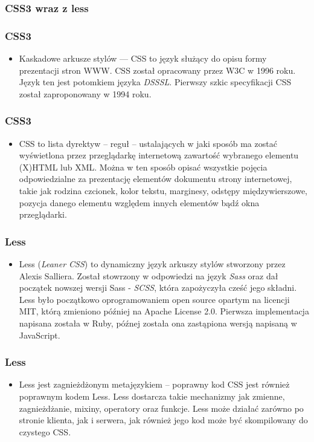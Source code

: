 \documentclass{beamer}
\newenvironment{justbe}%
{\setlength{\leftmargini}{0pt}\begin{itemize}\item[]}%
{\end{itemize}}
\begin{document}
\subsubsection{CSS3 wraz z less}
\begin{frame}
 \frametitle{CSS3}
 \begin{justbe}
  Kaskadowe arkusze stylów --- CSS to język służący do opisu formy prezentacji stron WWW. CSS został opracowany przez W3C w 1996 roku. Język ten jest potomkiem języka \emph{DSSSL}. Pierwszy szkic specyfikacji CSS został zaproponowany w 1994 roku. 
 \end{justbe}
\end{frame}

\begin{frame}
 \frametitle{CSS3}
 \begin{justbe}
  CSS to lista dyrektyw -- reguł -- ustalających w jaki sposób ma zostać wyświetlona przez przeglądarkę internetową zawartość wybranego elementu (X)HTML lub XML. Można w ten sposób opisać wszystkie pojęcia odpowiedzialne za prezentację elementów dokumentu strony internetowej, takie jak rodzina czcionek, kolor tekstu, marginesy, odstępy międzywierszowe, pozycja danego elementu względem innych elementów bądź okna przeglądarki.
 \end{justbe}
\end{frame}

\begin{frame}
 \frametitle{Less}
 \begin{justbe}
  Less (\emph{Leaner CSS}) to dynamiczny język arkuszy stylów stworzony przez Alexis Salliera. Został stowrzony w odpowiedzi na język \emph{Sass} oraz dał początek nowszej wersji Sass - \emph{SCSS}, która zapożyczyła cześć jego składni. Less było początkowo oprogramowaniem open source opartym na licencji MIT, którą zmieniono później na Apache License 2.0. Pierwsza implementacja napisana została w Ruby, późnej została ona zastąpiona wersją napisaną w JavaScript. 
 \end{justbe}
\end{frame}

\begin{frame}
 \frametitle{Less}
 \begin{justbe}
  Less jest zagnieżdżonym metajęzykiem -- poprawny kod CSS jest również poprawnym kodem Less. Less dostarcza takie mechanizmy jak zmienne, zagnieżdżanie, mixiny, operatory oraz funkcje. Less może działać zarówno po stronie klienta, jak i serwera, jak również jego kod może być skompilowany do czystego CSS.
 \end{justbe}
\end{frame}
\end{document}

